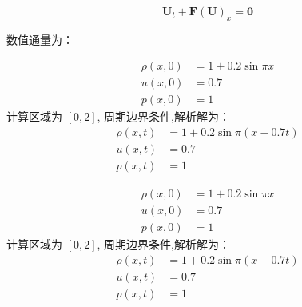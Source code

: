 \documentclass{book}
\begin{document}
\begin{equation}
    \mathbf{U}_{t}+\mathbf{F}(\mathbf{U})_{x}=\mathbf{0}
\end{equation}

数值通量为：

\begin{example}
    \begin{equation}
        \begin{aligned}
            \rho(x, 0) & =1+0.2 \sin \pi x \\
            u(x, 0)    & =0.7              \\
            p(x, 0)    & =1
        \end{aligned}
    \end{equation}
    计算区域为 $[0,2]$, 周期边界条件,解析解为：
    \begin{equation}
        \begin{aligned}
            \rho(x, t) & =1+0.2 \sin \pi(x-0.7 t) \\
            u(x, t)    & =0.7                     \\
            p(x, t)    & =1
        \end{aligned}
    \end{equation}
\end{example}


\begin{example}{}{}
    \begin{equation}
        \begin{aligned}
            \rho(x, 0) & =1+0.2 \sin \pi x \\
            u(x, 0)    & =0.7              \\
            p(x, 0)    & =1
        \end{aligned}
    \end{equation}
    计算区域为 $[0,2]$, 周期边界条件,解析解为：
    \begin{equation}
        \begin{aligned}
            \rho(x, t) & =1+0.2 \sin \pi(x-0.7 t) \\
            u(x, t)    & =0.7                     \\
            p(x, t)    & =1
        \end{aligned}
    \end{equation}
\end{example}
\end{document}
